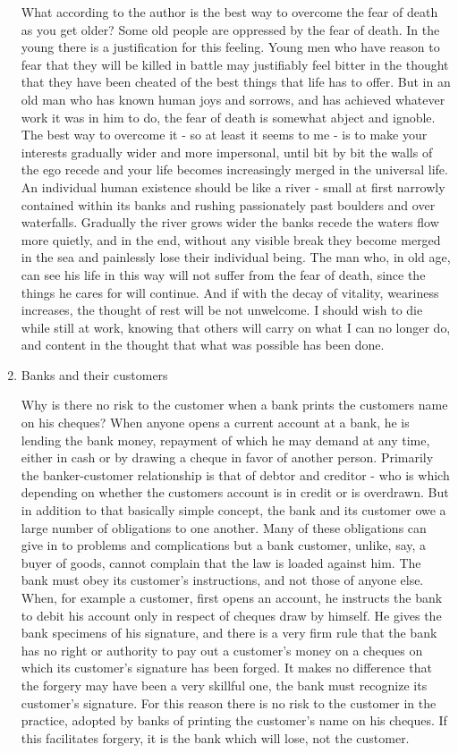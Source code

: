 \begin{enumerate}
What according to the author is the best way to overcome the fear of death as you get older? Some old people are oppressed by the fear of death.
In the young there is a justification for this feeling.
Young men who have reason to fear that they will be killed in battle may justifiably feel bitter in the thought that they have been cheated of the best things that life has to offer.
But in an old man who has known human joys and sorrows, and has achieved whatever work it was in him to do, the fear of death is somewhat abject and ignoble.
The best way to overcome it - so at least it seems to me - is to make your interests gradually wider and more impersonal, until bit by bit the walls of the ego recede and your life becomes increasingly merged in the universal life.
An individual human existence should be like a river - small at first narrowly contained within its banks and rushing passionately past boulders and over waterfalls.
Gradually the river grows wider the banks recede the waters flow more quietly, and in the end, without any visible break they become merged in the sea and painlessly lose their individual being.
The man who, in old age, can see his life in this way will not suffer from the fear of death, since the things he cares for will continue.
And if with the decay of vitality, weariness increases, the thought of rest will be not unwelcome.
I should wish to die while still at work, knowing that others will carry on what I can no longer do, and content in the thought that what was possible has been done.

\item  Banks and their customers

Why is there no risk to the customer when a bank prints the customers name on his cheques? When anyone opens a current account at a bank, he is lending the bank money, repayment of which he may demand at any time, either in cash or by drawing a cheque in favor of another person.
Primarily the banker-customer relationship is that of debtor and creditor - who is which depending on whether the customers account is in credit or is overdrawn.
But in addition to that basically simple concept, the bank and its customer owe a large number of obligations to one another.
Many of these obligations can give in to problems and complications but a bank customer, unlike, say, a buyer of goods, cannot complain that the law is loaded against him.
The bank must obey its customer's instructions, and not those of anyone else.
When, for example a customer, first opens an account, he instructs the bank to debit his account only in respect of cheques draw by himself.
He gives the bank specimens of his signature, and there is a very firm rule that the bank has no right or authority to pay out a customer's money on a cheques on which its customer's signature has been forged.
It makes no difference that the forgery may have been a very skillful one, the bank must recognize its customer's signature.
For this reason there is no risk to the customer in the practice, adopted by banks of printing the customer's name on his cheques.
If this facilitates forgery, it is the bank which will lose, not the customer.



\end{enumerate}
